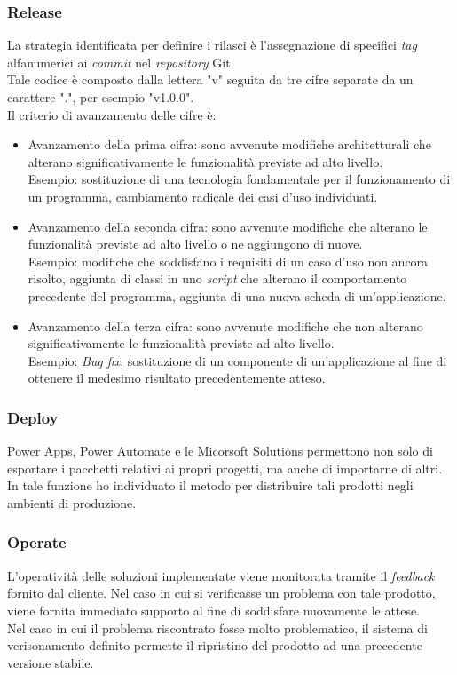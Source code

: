 \subsubsection*{Release}
La strategia identificata per definire i rilasci è l'assegnazione di specifici \emph{tag} alfanumerici ai \emph{commit} nel \emph{repository} Git.\\
Tale codice è composto dalla lettera "v" seguita da tre cifre separate da un carattere ".", per esempio "v1.0.0".\\
Il criterio di avanzamento delle cifre è: 
\begin{itemize}
    \item Avanzamento della prima cifra: sono avvenute modifiche architetturali che alterano significativamente le funzionalità previste ad alto livello.\\
    Esempio: sostituzione di una tecnologia fondamentale per il funzionamento di un programma, cambiamento radicale dei casi d'uso individuati.  
    \item Avanzamento della seconda cifra: sono avvenute modifiche che alterano le funzionalità previste ad alto livello o ne aggiungono di nuove.\\
    Esempio: modifiche che soddisfano i requisiti di un caso d'uso non ancora risolto, aggiunta di classi in uno \emph{script} che alterano il comportamento precedente del programma, aggiunta di una nuova scheda di un'applicazione.
    \item Avanzamento della terza cifra: sono avvenute modifiche che non alterano significativamente le funzionalità previste ad alto livello.\\
    Esempio: \emph{Bug fix}, sostituzione di un componente di un'applicazione al fine di ottenere il medesimo risultato precedentemente atteso. 
\end{itemize}

\subsubsection*{Deploy}
Power Apps, Power Automate e le Micorsoft Solutions permettono non solo di esportare i pacchetti relativi ai propri progetti, ma anche di importarne di altri.\\
In tale funzione ho individuato il metodo per distribuire tali prodotti negli ambienti di produzione. 

\subsubsection*{Operate}
L'operatività delle soluzioni implementate viene monitorata tramite il \emph{feedback} fornito dal cliente. Nel caso in cui si verificasse un problema con tale prodotto, viene fornita immediato supporto al fine di soddisfare nuovamente le attese.\\
Nel caso in cui il problema riscontrato fosse molto problematico, il sistema di verisonamento definito permette il ripristino del prodotto ad una precedente versione stabile. 

